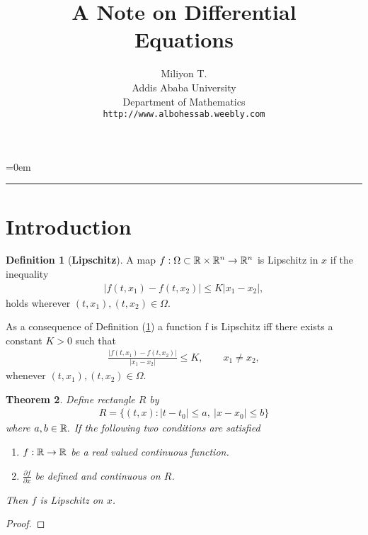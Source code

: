 \documentclass[leqno,DIV=calc,paper=a4,fontsize=11pt]{article}
\title{	\fontsize{50}{60}\selectfont
			\vspace*{0.7cm}
            \hfill A Note on Differential 	\\[0.8cm]
			\hfill Equations 	\\[0.8cm]
		}
\author{
		\hfill Miliyon T.\\	
		\hfill Addis Ababa University\\	
		\hfill Department of Mathematics\\
        \hfill \texttt{http://www.albohessab.weebly.com} \\
}
\makeatletter
\newtheorem{thm}{Theorem}[section]
\theoremstyle{definition}
\newtheorem{defn}[thm]{Definition}
\theoremstyle{plain}
\theoremstyle{remark}
\newcommand{\HRule}[1]{\hfill \rule{0.2\linewidth}{#1}} 	%
\def\printtitle{%
    {\centering \@title\par}}
\def\printauthor{%
    {\centering \large \@author}}
\makeatother
\begin{document}
\parindent=0em
\thispagestyle{empty}				%

\colorbox{grey}{
	\parbox[t]{1.0\linewidth}{
		\printtitle
		\vspace*{0.5cm}
	}
}

  	\vfill
\printauthor								%
\HRule{1pt}
\clearpage
\tableofcontents
\newpage
\section{Introduction}

\begin{defn}[\textbf{Lipschitz}]\label{def1}
A map $f:\Omega\subset \Bbb R\times\Bbb R^n\rightarrow \Bbb R^n$ is Lipschitz in $x$ if the inequality
\begin{align}
|f(t,x_1)-f(t,x_2)|\leq K|x_1-x_2|,
\end{align}
holds wherever $(t,x_1),(t,x_2)\in \Omega.$
\end{defn}
As a consequence of Definition (\ref{def1}) a function f is Lipschitz iff there exists a constant $K>0$ such that
\begin{align*}
\frac{|f(t,x_1)-f(t,x_2)|}{|x_1-x_2|}\leq K,\qquad x_1\neq x_2,
\end{align*}
whenever $(t,x_1),(t,x_2)\in \Omega.$
\begin{thm}
Define rectangle $R$ by
\begin{align*}
R=\{(t,x):|t-t_0|\leq a,\ |x-x_0|\leq b\}
\end{align*}
where $a,b\in \Bbb R.$ If the following two conditions are satisfied
\begin{enumerate}
  \item $f:\Bbb R\rightarrow \Bbb R$ be a real valued continuous function.
  \item $\frac{\partial f}{\partial x}$ be defined and continuous on $R$.
\end{enumerate}
Then $f$ is Lipschitz on $x$.
\end{thm}

\begin{proof}

\end{proof}
\end{document}
